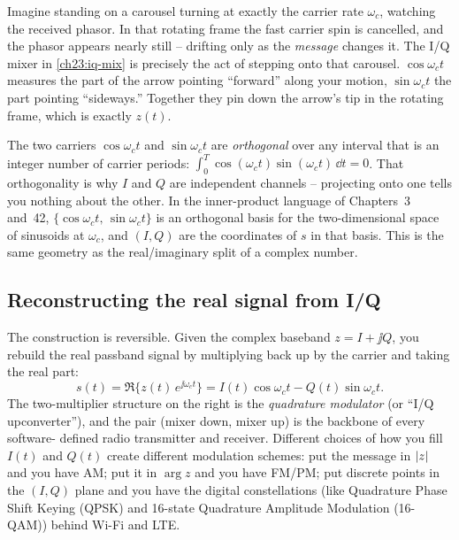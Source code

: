 \begin{intuitionbox}
Imagine standing on a carousel turning at exactly the carrier rate $\omega_c$, watching
the received phasor. In that rotating frame the fast carrier spin is cancelled, and the
phasor appears nearly still -- drifting only as the \emph{message} changes it. The I/Q
mixer in \eqref{ch23:iq-mix} is precisely the act of stepping onto that carousel.
$\cos\omega_c t$ measures the part of the arrow pointing ``forward'' along your motion,
$\sin\omega_c t$ the part pointing ``sideways.'' Together they pin down the arrow's tip
in the rotating frame, which is exactly $z(t)$.
\end{intuitionbox}

\begin{formalbox}
The two carriers $\cos\omega_c t$ and $\sin\omega_c t$ are \emph{orthogonal} over any
interval that is an integer number of carrier periods:
$\int_0^{T}\cos(\omega_c t)\sin(\omega_c t)\,\dd t = 0$. That orthogonality is why $I$ and
$Q$ are independent channels -- projecting onto one tells you nothing about the other.
In the inner-product language of Chapters~3 and~42, $\{\cos\omega_c t,\,
\sin\omega_c t\}$ is an orthogonal basis for the two-dimensional space of sinusoids at
$\omega_c$, and $(I,Q)$ are the coordinates of $s$ in that basis. This is the same
geometry as the real/imaginary split of a complex number.
\end{formalbox}

\subsection{Reconstructing the real signal from I/Q}
\label{ch23:iq-up}

The construction is reversible. Given the complex baseband $z=I+\jj Q$, you rebuild the
real passband signal by multiplying back up by the carrier and taking the real part:
\begin{equation}
\label{ch23:upconvert}
s(t) = \Re\!\big\{ z(t)\,e^{\jj\omega_c t}\big\}
     = I(t)\cos\omega_c t - Q(t)\sin\omega_c t.
\end{equation}
The two-multiplier structure on the right is the \emph{quadrature modulator} (or ``I/Q
upconverter''), and the pair (mixer down, mixer up) is the backbone of every software-
defined radio transmitter and receiver. Different choices of how you fill $I(t)$ and
$Q(t)$ create different modulation schemes: put the message in $\lvert z\rvert$ and you have
AM; put it in $\arg z$ and you have FM/PM; put discrete points in the $(I,Q)$ plane and
you have the digital constellations (like Quadrature Phase Shift Keying (QPSK) and 16-state Quadrature Amplitude Modulation (16-QAM)) behind Wi-Fi and LTE.


